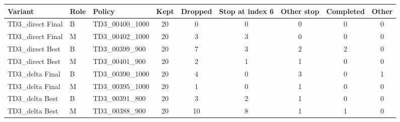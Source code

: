 \begin{tabular}{lllcccccc}
\midrule[1.5pt]
\textbf{Variant} & \textbf{Role} & \textbf{Policy} & \textbf{Kept} & \textbf{Dropped} & \textbf{Stop at index 6} & \textbf{Other stop} & \textbf{Completed} & \textbf{Other} \\
\midrule[1.5pt]
TD3\_direct Final & B & TD3\_00400\_1000 & 20 & 0 & 0 & 0 & 0 & 0 \\
TD3\_direct Final & M & TD3\_00402\_1000 & 20 & 3 & 3 & 0 & 0 & 0 \\
\midrule
TD3\_direct Best & B & TD3\_00399\_900 & 20 & 7 & 3 & 2 & 2 & 0 \\
TD3\_direct Best & M & TD3\_00401\_900 & 20 & 2 & 1 & 1 & 0 & 0 \\
\midrule
TD3\_delta Final & B & TD3\_00390\_1000 & 20 & 4 & 0 & 3 & 0 & 1 \\
TD3\_delta Final & M & TD3\_00395\_1000 & 20 & 1 & 0 & 1 & 0 & 0 \\
\midrule
TD3\_delta Best & B & TD3\_00391\_800 & 20 & 3 & 2 & 1 & 0 & 0 \\
TD3\_delta Best & M & TD3\_00388\_900 & 20 & 10 & 8 & 1 & 1 & 0 \\
\midrule[1.5pt]
\end{tabular}
